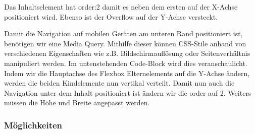 Das Inhaltselement hat order:2 damit es neben dem ersten auf der X-Achse
positioniert wird. Ebenso ist der Overflow auf der Y-Achse versteckt.

\begin{Shaded}
\begin{Highlighting}[]
\NormalTok{\{}
  \NormalTok{: }\NormalTok{;}
  \NormalTok{: }\NormalTok{;}
  \NormalTok{: }\NormalTok{;}
\NormalTok{\}}
\end{Highlighting}
\end{Shaded}

Damit die Navigation auf mobilen Geräten am unteren Rand positioniert
ist, benötigen wir eine Media Query. Mithilfe dieser können CSS-Stile
anhand von verschiedenen Eigenschaften wie z.B. Bildschirmauflösung oder
Seitenverhältnis manipuliert werden. Im untenstehenden Code-Block wird
dies veranschaulicht. Indem wir die Hauptachse des Flexbox
Elternelements auf die Y-Achse ändern, werden die beiden Kindelemente
nun vertikal verteilt. Damit nun auch die Navigation unter dem Inhalt
positioniert ist ändern wir die order auf 2. Weiters müssen die Höhe und
Breite angepasst werden.

\begin{Shaded}
\begin{Highlighting}[]
\NormalTok{ (}\NormalTok{: }\DecValTok{576px}\NormalTok{)\{}
  \NormalTok{\{}
\NormalTok{  \}}

  \NormalTok{\{}
      \NormalTok{: }
      \NormalTok{: }
      \NormalTok{: }\DecValTok{66px}
\NormalTok{    \}}
\NormalTok{  \}}
\end{Highlighting}
\end{Shaded}

\hypertarget{muxf6glichkeiten}{%
\subsubsection{Möglichkeiten}\label{muxf6glichkeiten}}
